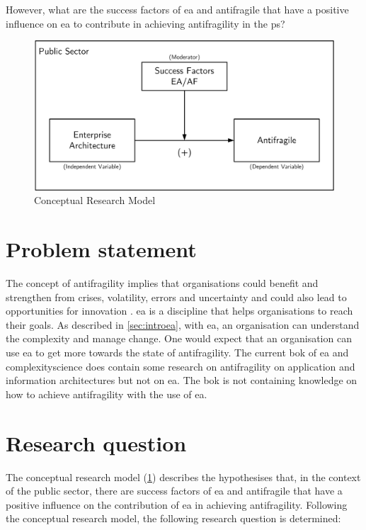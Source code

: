 However, what are the success factors of \acrshort{ea} and \gls{antifragile} that have a positive influence on \acrshort{ea} to contribute in achieving \gls{antifragility} in the \gls{ps}? 
\begin{figure}[H]
	\centering
	\includegraphics[width=0.7\linewidth]{images/conceptualmodel}
	\caption[Conceptual Research Model]{Conceptual Research Model}
	\label{fig:conceptualmodel}
\end{figure}


\section{Problem statement}
\label{sec:problemstatement}
The concept of \gls{antifragility} implies that organisations could benefit and strengthen from crises, volatility, errors and uncertainty and could also lead to opportunities for innovation \parencite{Kastner2017}. \acrshort{ea} is a discipline that helps organisations to reach their goals. As described in \cref{sec:introea}, with \acrshort{ea}, an organisation can understand the complexity and manage change. One would expect that an organisation can use \acrshort{ea} to get more towards the state of \gls{antifragility}. The current \acrfull{bok} of \acrshort{ea} and \gls{complexityscience} does contain some research on \gls{antifragility} on application and information architectures but not on \acrshort{ea}. The \acrshort{bok} is not containing knowledge on how to achieve \gls{antifragility} with the use of \acrshort{ea}.


\section{Research question}
\label{sec:introresearchquestion}
 The conceptual research model (\cref{fig:conceptualmodel}) describes the hypothesises that, in the context of the public sector, there are success factors of \acrshort{ea} and \gls{antifragile} that have a positive influence on the contribution of \acrlong{ea} in achieving \gls{antifragility}. Following the conceptual research model, the following research question is determined:\bigskip

